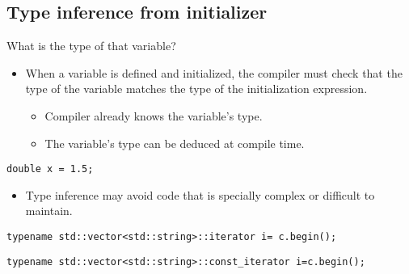 \subsection{Type inference from initializer}

\begin{frame}[t,fragile]{What is the type of that variable?}
  \begin{itemize}
    \item When a variable is defined and initialized, 
          the compiler must check that the type of the variable
          matches the type of the initialization expression.
      \begin{itemize}
        \item Compiler already knows the variable's type.
        \item The variable's type can be deduced at compile time.
      \end{itemize}
  \end{itemize}
\pause
\begin{lstlisting}
double x = 1.5;
\end{lstlisting}
\pause
  \begin{itemize}
    \item Type inference may avoid code that is specially 
       complex or difficult to maintain.
  \end{itemize}
\pause
\begin{lstlisting}
typename std::vector<std::string>::iterator i= c.begin();
\end{lstlisting}
\pause
\begin{lstlisting}
typename std::vector<std::string>::const_iterator i=c.begin();
\end{lstlisting}
\end{frame}


